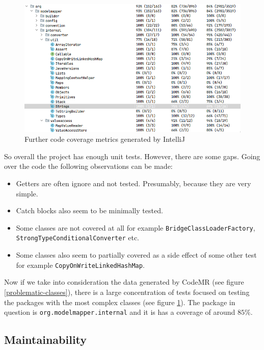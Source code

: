 \documentclass[12pt]{article}
\begin{document}
\begin{figure}[H]
    \centering
    \includegraphics[width=14cm]{images/code-coverage-2.png}
    \caption{Further code coverage metrics generated by IntelliJ}
    \label{intellij-code-coverage-2}
\end{figure}

So overall the project has enough unit tests. However, there are
some gaps. Going over the code the following observations can be
made:

\begin{itemize}
    \item Getters are often ignore and not tested. Presumably,
        because they are very simple.
    \item Catch blocks also seem to be minimally tested.
    \item Some classes are not covered at all for example
        \texttt{BridgeClassLoaderFactory}, \linebreak
        \texttt{StrongTypeConditionalConverter} etc.
    \item Some classes also seem to partially covered as a side
        effect of some other test for example
        \texttt{CopyOnWriteLinkedHashMap}.
\end{itemize}

Now if we take into consideration the data generated by CodeMR
(see figure \ref{problematic-classes}), there is a large
concentration of tests focused on testing the packages with the
most complex classes (see figure
\ref{intellij-code-coverage-2}). The package in question is
\texttt{org.modelmapper.internal} and it is has a coverage of
around $85\%$.

\subsection{Maintainability}
\end{document}
